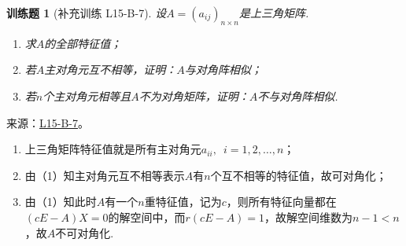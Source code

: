 \documentclass[12pt,fontset=fandol]{ctexart}
\newtheorem{exercise}{训练题}[section]
\begin{document}
\begin{exercise}[补充训练 L15-B-7]\label{prob:L15-B-7}
设$A=(a_{ij})_{n\times n}$是上三角矩阵.
        \begin{enumerate}
            \item 求$A$的全部特征值；

            \item 若$A$主对角元互不相等，证明：$A$与对角阵相似；

            \item 若$n$个主对角元相等且$A$不为对角矩阵，证明：$A$不与对角阵相似.
        \end{enumerate}
\end{exercise}
\noindent 来源：\href{https://github.com/yhwu-is/Linear-Algebra-Left-Undone/blob/new/%E8%AE%B2%E4%B9%89/%E4%B8%93%E9%A2%98/15%20%E7%9B%B8%E4%BC%BC%E6%A0%87%E5%87%86%E5%BD%A2%EF%BC%9A%E5%A4%8D%E6%95%B0%E5%9F%9F%E4%B8%8A%E7%9A%84%E5%B0%9D%E8%AF%95%E4%B8%8E%E7%90%86%E8%AE%BA.tex}{L15-B-7}。
\begin{solve}
\begin{enumerate}
                \item 上三角矩阵特征值就是所有主对角元$a_{ii},\enspace i=1,2,\ldots,n$；

                \item 由（1）知主对角元互不相等表示$A$有$n$个互不相等的特征值，故可对角化；

                \item 由（1）知此时$A$有一个$n$重特征值，记为$c$，则所有特征向量都在$(cE-A)X=0$的解空间中，而$r(cE-A)=1$，故解空间维数为$n-1<n$，故$A$不可对角化.
            \end{enumerate}
\end{solve}
\end{document}
